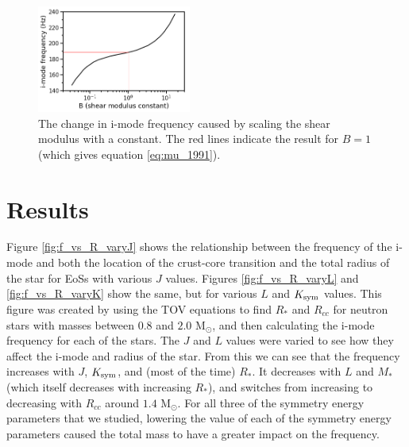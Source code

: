 \documentclass[fleqn,usenatbib]{mnras}
\begin{document}
\begin{figure}
\centering
\includegraphics[width=0.45\textwidth,angle=0]{B_vs_f.png}
\caption{The change in i-mode frequency caused by scaling the shear modulus with a constant. The red lines indicate the result for $B=1$ (which gives equation \ref{eq:mu_1991}).}
\label{fig:mu_B}
\end{figure}









\section{Results}
\hspace{\parindent}Figure \ref{fig:f_vs_R_varyJ} shows the relationship between the frequency of the i-mode and both the location of the crust-core transition and the total radius of the star for EoSs with various $J$ values. Figures \ref{fig:f_vs_R_varyL} and \ref{fig:f_vs_R_varyK} show the same, but for various $L$ and $K_{\rm sym}$ values. This figure was created by using the TOV equations to find $R_*$ and $R_{cc}$ for neutron stars with masses between $0.8$ and $2.0$ M$_{\odot}$, and then calculating the i-mode frequency for each of the stars. The $J$ and $L$ values were varied to see how they affect the i-mode and radius of the star. From this we can see that the frequency increases with $J$, $K_{\rm sym}$, and (most of the time) $R_*$. It decreases with $L$ and $M_*$ (which itself decreases with increasing $R_*$), and switches from increasing to decreasing with $R_{cc}$ around $1.4$ M$_{\odot}$. For all three of the symmetry energy parameters that we studied, lowering the value of each of the symmetry energy parameters caused the total mass to have a greater impact on the frequency.
\end{document}
